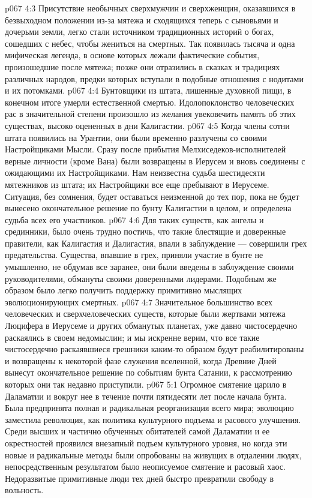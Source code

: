 \vs p067 4:3 Присутствие необычных сверхмужчин и сверхженщин, оказавшихся в безвыходном положении из\hyp{}за мятежа и сходящихся теперь с сыновьями и дочерьми земли, легко стали источником традиционных историй о богах, сошедших с небес, чтобы жениться на смертных. Так появилась тысяча и одна мифическая легенда, в основе которых лежали фактические события, произошедшие после мятежа; позже они отразились в сказках и традициях различных народов, предки которых вступали в подобные отношения с нодитами и их потомками.
\vs p067 4:4 Бунтовщики из штата, лишенные духовной пищи, в конечном итоге умерли естественной смертью. Идолопоклонство человеческих рас в значительной степени произошло из желания увековечить память об этих существах, высоко оцененных в дни Калигастии.
\vs p067 4:5 Когда члены сотни штата появились на Урантии, они были временно разлучены со своими Настройщиками Мысли. Сразу после прибытия Мелхиседеков\hyp{}исполнителей верные личности (кроме Вана) были возвращены в Иерусем и вновь соединены с ожидающими их Настройщиками. Нам неизвестна судьба шестидесяти мятежников из штата; их Настройщики все еще пребывают в Иерусеме. Ситуация, без сомнения, будет оставаться неизменной до тех пор, пока не будет вынесено окончательное решение по бунту Калигастии в целом, и определена судьба всех его участников.
\vs p067 4:6 \pc Для таких существ, как ангелы и срединники, было очень трудно постичь, что такие блестящие и доверенные правители, как Калигастия и Далигастия, впали в заблуждение --- совершили грех предательства. Существа, впавшие в грех, приняли участие в бунте не умышленно, не обдумав все заранее, они были введены в заблуждение своими руководителями, обмануты своими доверенными лидерами. Подобным же образом было легко получить поддержку примитивно мыслящих эволюционирующих смертных.
\vs p067 4:7 Значительное большинство всех человеческих и сверхчеловеческих существ, которые были жертвами мятежа Люцифера в Иерусеме и других обманутых планетах, уже давно чистосердечно раскаялись в своем недомыслии; и мы искренне верим, что все такие чистосердечно раскаявшиеся грешники каким\hyp{}то образом будут реабилитированы и возвращены к некоторой фазе служения вселенной, когда Древние Дней вынесут окончательное решение по событиям бунта Сатании, к рассмотрению которых они так недавно приступили.
\vs p067 5:1 Огромное смятение царило в Даламатии и вокруг нее в течение почти пятидесяти лет после начала бунта. Была предпринята полная и радикальная реорганизация всего мира; эволюцию заместила революция, как политика культурного подъема и расового улучшения. Среди высших и частично обученных обитателей самой Даламатии и ее окрестностей проявился внезапный подъем культурного уровня, но когда эти новые и радикальные методы были опробованы на живущих в отдалении людях, непосредственным результатом было неописуемое смятение и расовый хаос. Недоразвитые примитивные люди тех дней быстро превратили свободу в вольность.
